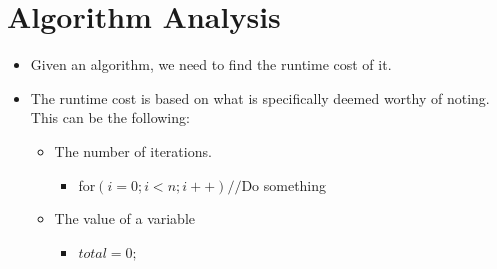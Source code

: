 \documentclass{article}
\begin{document}
\section{Algorithm Analysis}
\begin{itemize}
    \item Given an algorithm, we need to find the runtime cost of it.
    \item The runtime cost is based on what is specifically deemed worthy of noting. This can be the following:
        \begin{itemize}
            \item The number of iterations.
                \begin{itemize}
                    \item for$(i = 0; i < n; i++) // $Do something
                \end{itemize}
            \item The value of a variable
                \begin{itemize}
                    \item 
                        $total = 0;$


\end{itemize}
\end{itemize}
\end{itemize}
\end{document}
